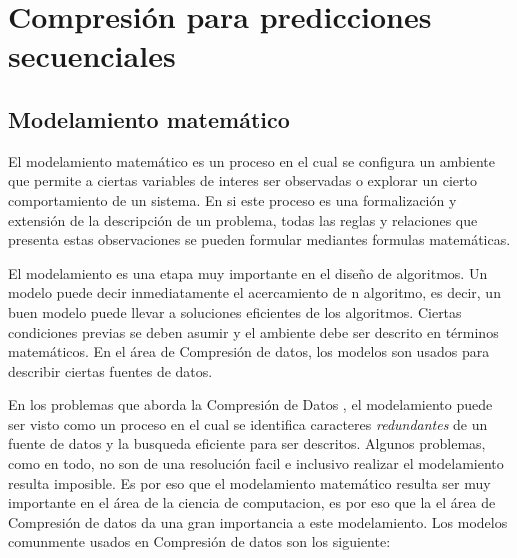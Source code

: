 \uncm
\section{Compresión para predicciones secuenciales}


\uncm



\subsection{Modelamiento matemático}\label{sec-ldc-model-math}

El modelamiento matemático es un proceso en el cual se configura un ambiente que permite a ciertas variables de interes ser observadas o explorar un cierto comportamiento  de un sistema. En si este proceso es una formalización y extensión de la descripción de un problema, todas las reglas y relaciones que presenta estas observaciones se pueden formular mediantes formulas matemáticas.

El modelamiento es una etapa muy importante en el diseño de algoritmos. Un modelo puede decir inmediatamente el acercamiento de n algoritmo, es decir, un  buen modelo puede llevar a soluciones eficientes de los algoritmos. Ciertas condiciones previas se deben asumir y el ambiente debe ser descrito  en términos matemáticos. En el área de Compresión de datos, los modelos son usados para describir ciertas fuentes de datos.



En los problemas que aborda la Compresión de Datos , el modelamiento puede ser visto como un proceso en el cual se identifica caracteres \emph{redundantes} de un fuente de datos y la busqueda eficiente para ser descritos. Algunos problemas, como en todo, no son de una resolución facil e inclusivo realizar el modelamiento resulta imposible. Es por eso que el modelamiento matemático resulta ser muy importante en el área de la ciencia de computacion, es por eso que la el área de Compresión de datos da una gran importancia a este modelamiento. Los modelos comunmente usados en Compresión de datos son los siguiente:

